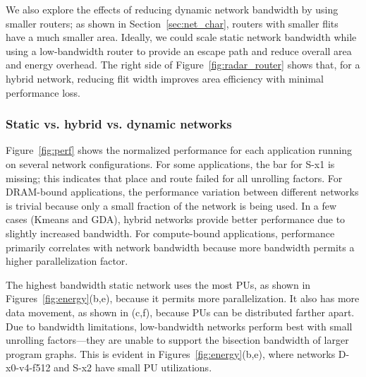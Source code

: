 We also explore the effects of reducing dynamic network bandwidth by using smaller routers;
as shown in Section~\ref{sec:net_char}, routers with smaller flits have a much smaller area.
Ideally, we could scale static network bandwidth while using a low-bandwidth router to provide an escape path and reduce overall area and energy overhead. 
The right side of Figure~\ref{fig:radar_router} shows that, for a hybrid network, reducing flit width improves area efficiency with minimal performance loss. 


\subsubsection{Static vs. hybrid vs. dynamic networks}

Figure~\ref{fig:perf} shows the normalized performance for each application running on several network configurations.
For some applications, the bar for S-x1 is missing; this indicates that place and route failed for all unrolling factors.
For DRAM-bound applications, the performance variation between different networks is trivial because only a small fraction of the network is being used. 
In a few cases (Kmeans and GDA), hybrid networks  provide better performance due to slightly increased bandwidth.
For compute-bound applications, performance primarily correlates with network bandwidth because more bandwidth permits a higher parallelization factor. 

The highest bandwidth static network uses the most PUs, as shown in Figures~\ref{fig:energy}(b,e), because it permits more parallelization. 
It also has more data movement, as shown in (c,f), because PUs can be distributed farther apart. 
Due to bandwidth limitations, low-bandwidth networks perform best with small unrolling factors---they are unable to support the bisection bandwidth of larger program graphs.
This is evident in Figures~\ref{fig:energy}(b,e), where networks D-x0-v4-f512 and S-x2 have small PU utilizations.

